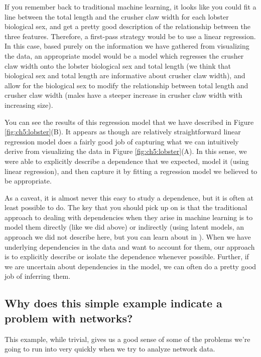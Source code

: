 If you remember back to traditional machine learning, it looks like you could fit a line between the total length and the crusher claw width for each lobster biological sex, and get a pretty good description of the relationship between the three features. Therefore, a first-pass strategy would be to use a linear regression. In this case, based purely on the information we have gathered from visualizing the data, an appropriate model would be a model which regresses the crusher claw width onto the lobster biological sex and total length (we think that biological sex and total length are informative about crusher claw width), and allow for the biological sex to modify the relationship between total length and crusher claw width (males have a steeper increase in crusher claw width with increasing size). 

You can see the results of this regression model that we have described in Figure \ref{fig:ch5:lobster}(B). It appears as though are relatively straightforward linear regression model does a fairly good job of capturing what we can intuitively derive from visualizing the data in Figure \ref{fig:ch5:lobster}(A). In this sense, we were able to explicitly describe a dependence that we expected, model it (using linear regression), and then capture it by fitting a regression model we believed to be appropriate.

As a caveat, it is almost never this easy to study a dependence, but it is often at least {possible} to do. The key that you should pick up on is that the traditional approach to dealing with dependencies when they arise in machine learning is to model them directly (like we did above) or indirectly (using latent models, an approach we did not describe here, but you can learn about in \cite{Hastie2009}). When we have underlying dependencies in the data and want to account for them, our approach is to explicitly describe or isolate the dependence whenever possible. Further, if we are uncertain about dependencies in the model, we can often do a pretty good job of inferring them.



\subsection{Why does this simple example indicate a problem with networks?}

This example, while trivial, gives us a good sense of some of the problems we're going to run into very quickly when we try to analyze network data. 

